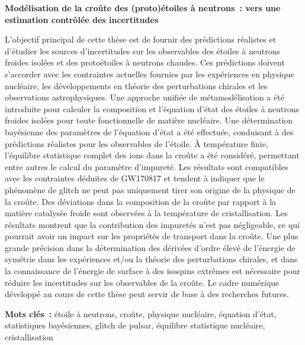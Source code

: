 \begin{changemargin}{-0.2cm}{-1.2cm}
\begin{center}
  \textbf{Modélisation de la croûte des (proto)étoiles à neutrons~: vers une
  estimation contrôlée des incertitudes}
\end{center}

L'objectif principal de cette thèse est de fournir des prédictions réalistes et 
d'étudier les sources d'incertitudes sur les observables des étoiles à 
neutrons froides isolées et des protoétoiles à neutrons chaudes. Ces
prédictions doivent s'accorder avec les contraintes actuelles fournies par 
les expériences en physique nucléaire, les développements en théorie des perturbations chirales et les observations astrophysiques.
Une approche unifiée de métamodélisation a été introduite pour calculer la 
composition et l'équation d'état des étoiles à neutrons froides isolées pour 
toute fonctionnelle de matière nucléaire.
Une détermination bayésienne des paramètres de l'équation d'état a été 
effectuée, conduisant à des prédictions réalistes pour les observables
de l'étoile.
À température finie, l'équilibre statistique complet des ions dans la croûte 
a été considéré, permettant entre autres le calcul du paramètre d'impureté.
Les résultats sont compatibles avec les contraintes déduites de GW170817 et 
tendent à indiquer que le phénomène de glitch ne peut pas uniquement tirer son 
origine de la physique de la croûte.
Des déviations dans la composition de la croûte par rapport à la matière 
catalysée froide sont observées à la 
température de cristallisation. Les résultats montrent que la contribution des 
impuretés n'est pas négligeable, ce qui pourrait avoir un impact sur les 
propriétés de transport dans la croûte.
Une plus grande précision dans la détermination des dérivées 
d'ordre élevé de l'énergie de symétrie dans les expériences et/ou la théorie 
des perturbations chirales, et dans la connaissance de l'énergie de surface à 
des isospins extrêmes est nécessaire pour réduire les incertitudes sur les 
observables de la croûte. 
Le cadre numérique développé au cours de cette thèse peut servir de 
base à des recherches futures.

\textbf{Mots clés~:} 
étoile à neutrons, croûte, physique nucléaire, équation d'état, statistiques 
bayésiennes, glitch de pulsar, équilibre statistique nucléaire, cristallisation

\end{changemargin}

\thispagestyle{empty}
